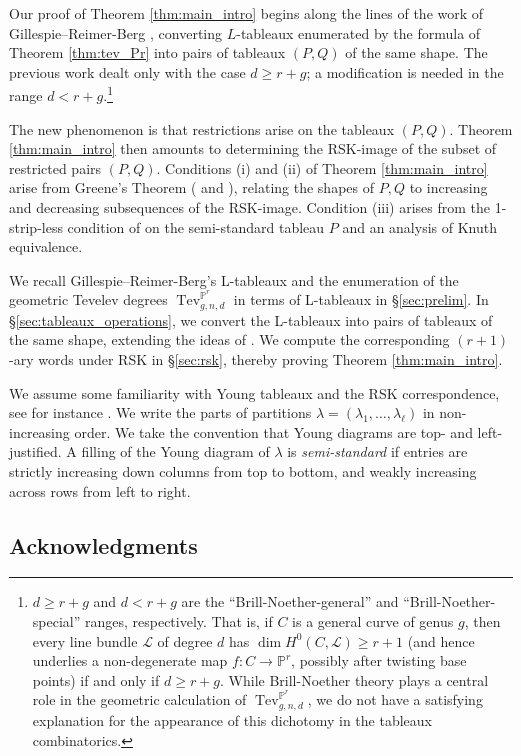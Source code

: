 \documentclass[12pt]{amsart}
\def\bP{\mathbb{P}}
\def\cL{\mathcal{L}}
\DeclareMathOperator{\Tev}{Tev}
\begin{document}
Our proof of Theorem \ref{thm:main_intro} begins along the lines of the work of Gillespie--Reimer-Berg \cite{GenRSK}, converting $L$-tableaux enumerated by the formula of Theorem \ref{thm:tev_Pr} into pairs of tableaux $(P,Q)$ of the same shape. The previous work dealt only with the case $d\ge r+g$; a modification is needed in the range $d<r+g$.\footnote{$d\ge r+g$ and $d<r+g$ are the ``Brill-Noether-general'' and ``Brill-Noether-special'' ranges, respectively. That is, if $C$ is a general curve of genus $g$, then every line bundle $\cL$ of degree $d$ has $\dim H^0(C,\cL)\ge r+1$ (and hence underlies a non-degenerate map $f:C\to\bP^r$, possibly after twisting base points) if and only if $d\ge r+g$. While Brill-Noether theory plays a central role in the geometric calculation of $\Tev^{\bP^r}_{g,n,d}$, we do not have a satisfying explanation for the appearance of this dichotomy in the tableaux combinatorics.}

The new phenomenon is that restrictions arise on the tableaux $(P,Q)$. Theorem \ref{thm:main_intro} then amounts to determining the RSK-image of the subset of restricted pairs $(P,Q)$. Conditions (i) and (ii) of Theorem \ref{thm:main_intro} arise from Greene's Theorem (\cite[Theorem 4.8.10]{sagan} and \cite{greene}), relating the shapes of $P,Q$ to increasing and decreasing subsequences of the RSK-image. Condition (iii) arises from the 1-strip-less condition of \cite{lian_lr} on the semi-standard tableau $P$ and an analysis of Knuth equivalence.

We recall Gillespie--Reimer-Berg's L-tableaux and the enumeration of the geometric Tevelev degrees $\Tev^{\bP^r}_{g,n,d}$ in terms of L-tableaux in \S\ref{sec:prelim}. In \S\ref{sec:tableaux_operations}, we convert the L-tableaux into pairs of tableaux of the same shape, extending the ideas of \cite{GenRSK}. We compute the corresponding $(r+1)$-ary words under RSK in \S\ref{sec:rsk}, thereby proving Theorem \ref{thm:main_intro}.

We assume some familiarity with Young tableaux and the RSK correspondence, see for instance \cite[\S 7]{stanley}. We write the parts of partitions $\lambda=(\lambda_1,\ldots,\lambda_\ell)$ in non-increasing order. We take the convention that Young diagrams are top- and left-justified. A filling of the Young diagram of $\lambda$ is \emph{semi-standard} if entries are strictly increasing down columns from top to bottom, and weakly increasing across rows from left to right.

\subsection{Acknowledgments}
\end{document}
